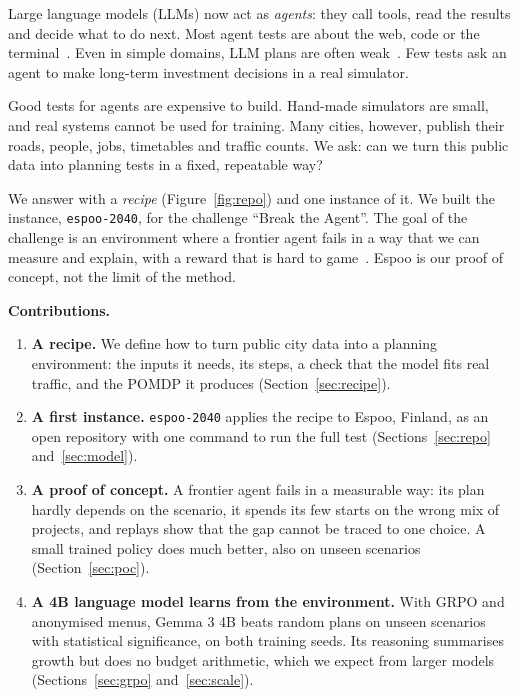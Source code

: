 \documentclass{article}
\newcommand{\repo}{\texttt{espoo-2040}}
\begin{document}
Large language models (LLMs) now act as \emph{agents}: they call tools, read the results and decide what to do next. Most agent tests are about the web, code or the terminal~\cite{zhou2024,jimenez2024,merrill2026,yao2025}. Even in simple domains, LLM plans are often weak~\cite{valmeekam2023}. Few tests ask an agent to make long-term investment decisions in a real simulator.

Good tests for agents are expensive to build. Hand-made simulators are small, and real systems cannot be used for training. Many cities, however, publish their roads, people, jobs, timetables and traffic counts. We ask: can we turn this public data into planning tests in a fixed, repeatable way?

We answer with a \emph{recipe} (Figure~\ref{fig:repo}) and one instance of it. We built the instance, \repo{}, for the challenge ``Break the Agent''. The goal of the challenge is an environment where a frontier agent fails in a way that we can measure and explain, with a reward that is hard to game~\cite{skalse2022,amodei2016}. Espoo is our proof of concept, not the limit of the method.

\textbf{Contributions.}
\begin{enumerate}
\item \textbf{A recipe.} We define how to turn public city data into a planning environment: the inputs it needs, its steps, a check that the model fits real traffic, and the POMDP it produces (Section~\ref{sec:recipe}).
\item \textbf{A first instance.} \repo{} applies the recipe to Espoo, Finland, as an open repository with one command to run the full test (Sections~\ref{sec:repo} and~\ref{sec:model}).
\item \textbf{A proof of concept.} A frontier agent fails in a measurable way: its plan hardly depends on the scenario, it spends its few starts on the wrong mix of projects, and replays show that the gap cannot be traced to one choice. A small trained policy does much better, also on unseen scenarios (Section~\ref{sec:poc}).
\item \textbf{A 4B language model learns from the environment.} With GRPO and anonymised menus, Gemma 3 4B beats random plans on unseen scenarios with statistical significance, on both training seeds. Its reasoning summarises growth but does no budget arithmetic, which we expect from larger models (Sections~\ref{sec:grpo} and~\ref{sec:scale}).
\end{enumerate}
\end{document}
